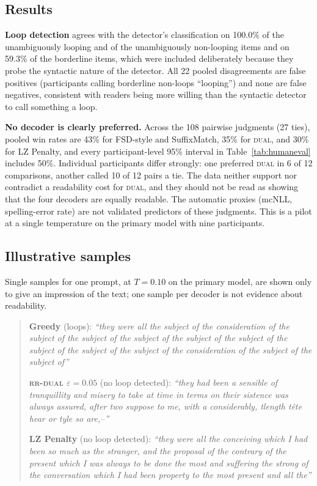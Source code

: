 \documentclass[make,article,submit,pdftex]{Definitions/mdpi}
\begin{document}
\subsection{Results}
\textbf{Loop detection} agrees with the detector's classification on 100.0\% of the unambiguously looping and of the unambiguously non-looping items and on 59.3\% of the borderline items, which were included deliberately because they probe the syntactic nature of the detector. All 22 pooled disagreements are false positives (participants calling borderline non-loops ``looping'') and none are false negatives, consistent with readers being more willing than the syntactic detector to call something a loop.

\textbf{No decoder is clearly preferred.} Across the 108 pairwise judgments (27 ties), pooled win rates are 43\% for FSD-style and SuffixMatch, 35\% for \textsc{dual}, and 30\% for LZ Penalty, and every participant-level 95\% interval in Table~\ref{tab:humaneval} includes 50\%. Individual participants differ strongly: one preferred \textsc{dual} in 6 of 12 comparisons, another called 10 of 12 pairs a tie. The data neither support nor contradict a readability cost for \textsc{dual}, and they should not be read as showing that the four decoders are equally readable. The automatic proxies (mcNLL, spelling-error rate) are not validated predictors of these judgments. This is a pilot at a single temperature on the primary model with nine participants.

\subsection{Illustrative samples}
Single samples for one prompt, at $T{=}0.10$ on the primary model, are shown only to give an impression of the text; one sample per decoder is not evidence about readability.
\begin{quote}\small
\textbf{Greedy} (loops): \emph{``they were all the subject of the consideration of the subject of the subject of the subject of the subject of the subject of the subject of the subject of the subject of the consideration of the subject of the subject of''}

\textbf{\textsc{rr-dual} $\varepsilon{=}0.05$} (no loop detected): \emph{``they had been a sensible of tranquillity and misery to take at time in terms on their sistence was always assured, after two suppose to me, with a considerably, tlength t\^ete hear or tyle so are,--''}

\textbf{LZ Penalty} (no loop detected): \emph{``they were all the conceiving which I had been so much as the stranger, and the proposal of the contrary of the present which I was always to be done the most and suffering the strong of the conversation which I had been property to the most present and all the''}
\end{quote}
\end{document}
